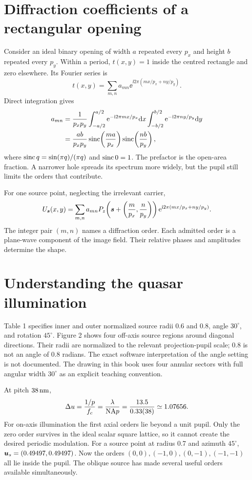 \section{Diffraction coefficients of a rectangular opening}
Consider an ideal binary opening of width $a$ repeated every $p_x$
and height $b$ repeated every $p_y$. Within a period,
$t(x,y)=1$ inside the centred rectangle and zero elsewhere.
Its Fourier series is
\[
t(x,y)=\sum_{m,n}a_{mn}
\ee^{\ii2\pi(mx/p_x+ny/p_y)}.
\]
Direct integration gives
\begin{align}
a_{mn}
&=\frac{1}{p_xp_y}
\int_{-a/2}^{a/2}\mathrm{e}^{-\mathrm{i}2\pi mx/p_x}\mathrm{d} x
\int_{-b/2}^{b/2}\mathrm{e}^{-\mathrm{i}2\pi ny/p_y}\mathrm{d} y\\
&=\frac{ab}{p_xp_y}
\operatorname{sinc}\!\left(\frac{ma}{p_x}\right)
\operatorname{sinc}\!\left(\frac{nb}{p_y}\right),
\label{eq:rectcoeff}
\end{align}
where $\operatorname{sinc} q=\sin(\pi q)/(\pi q)$ and $\operatorname{sinc}0=1$.
The prefactor is the open-area fraction. A narrower hole spreads its
spectrum more widely, but the pupil still limits the orders that contribute.

For one source point, neglecting the irrelevant carrier,
\begin{equation}
U_{\bm{s}}(x,y)=\sum_{m,n}a_{mn}
P_z\!\left(\bm{s}+\left(\frac m{p_x},\frac n{p_y}\right)\right)
\mathrm{e}^{\mathrm{i}2\pi(mx/p_x+ny/p_y)}.
\label{eq:orders}
\end{equation}
The integer pair $(m,n)$ names a diffraction order.
Each admitted order is a plane-wave component of the image field.
Their relative phases and amplitudes determine the shape.

\section{Understanding the quasar illumination}
Table 1 specifies inner and outer normalized source radii 0.6 and 0.8,
angle $30^\circ$, and rotation $45^\circ$.
Figure 2 shows four off-axis source regions around diagonal directions.
Their radii are normalized to the relevant projection-pupil scale;
0.8 is not an angle of 0.8 radians.
The exact software interpretation of the angle setting is not documented.
The drawing in this book uses four annular sectors with full angular
width $30^\circ$ as an explicit teaching convention.

At pitch $38\,\mathrm{nm}$,
\[
\Delta u=\frac{1/p}{f_c}
=\frac{\lambda}{\mathrm{NA} p}
=\frac{13.5}{0.33(38)}\simeq1.07656.
\]
For on-axis illumination the first axial orders lie beyond a unit pupil.
Only the zero order survives in the ideal scalar square lattice,
so it cannot create the desired periodic modulation.
For a source point at radius 0.7 and azimuth $45^\circ$,
$\bm{u}_s=(0.49497,0.49497)$.
Now the orders $(0,0),(-1,0),(0,-1),(-1,-1)$ all lie inside the pupil.
The oblique source has made several useful orders available simultaneously.

